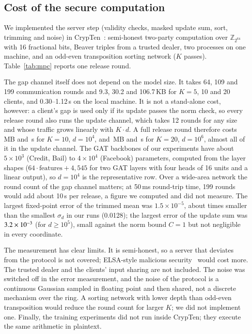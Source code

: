 \subsection{Cost of the secure computation}\label{sec:mpc}



We implemented the server step (validity checks, masked update sum, sort, trimming and noise) in CrypTen~\citep{knott2021crypten}: semi-honest two-party computation over $\mathbb{Z}_{2^{64}}$ with 16 fractional bits, Beaver triples from a trusted dealer, two processes on one machine, and an odd-even transposition sorting network ($K$ passes). Table~\ref{tab:mpc} reports one release round.

The gap channel itself does not depend on the model size. It takes 64, 109 and 199 communication rounds and 9.3, 30.2 and 106.7\,KB for $K=5$, 10 and 20 clients, and 0.30--1.12\,s on the local machine. It is not a stand-alone cost, however: a client's gap is used only if its update passes the norm check, so every release round also runs the update channel, which takes 12 rounds for any size and whose traffic grows linearly with $K\cdot d$. A full release round therefore costs \mpcTenMB\,MB and \mpcTenS\,s for $K=10$, $d=10^4$, and \mpcFullMB\,MB and \mpcFullS\,s for $K=20$, $d=10^6$, almost all of it in the update channel. The GAT backbones of our experiments have about $5\times10^3$ (Credit, Bail) to $4\times10^4$ (Facebook) parameters, computed from the layer shapes ($64\cdot\text{features}+4{,}545$ for two GAT layers with four heads of 16 units and a linear output), so $d=10^4$ is the representative row. Over a wide-area network the round count of the gap channel matters; at 50\,ms round-trip time, 199 rounds would add about 10\,s per release, a figure we computed and did not measure. The largest fixed-point error of the trimmed mean was $1.5\times10^{-5}$, about \mpcErrRatio{} times smaller than the smallest $\sigma_d$ in our runs (0.0128); the largest error of the update sum was $3.2\times10^{-3}$ (for $d\ge10^5$), small against the norm bound $C=1$ but not negligible in every coordinate.

The measurement has clear limits. It is semi-honest, so a server that deviates from the protocol is not covered; ELSA-style malicious security~\citep{rathee2023elsa} would cost more. The trusted dealer and the clients' input sharing are not included. The noise was switched off in the error measurement, and the noise of the protocol is a continuous Gaussian sampled in floating point and then shared, not a discrete mechanism over the ring. A sorting network with lower depth than odd-even transposition would reduce the round count for larger $K$; we did not implement one. Finally, the training experiments did not run inside CrypTen; they execute the same arithmetic in plaintext.

